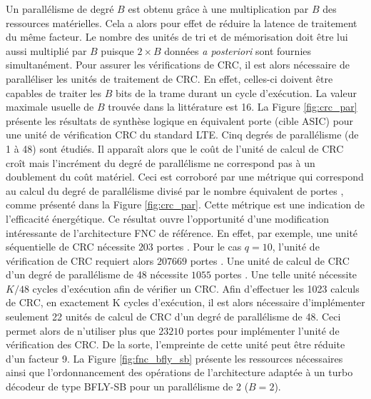 Un parallélisme de degré $B$ est obtenu grâce à une multiplication par $B$ des ressources 
matérielles. Cela a alors pour effet de réduire la latence de traitement du même facteur. Le nombre 
des unités de tri et
de mémorisation doit être lui aussi multiplié par $B$ puisque $2\times B$ données \textit{a posteriori} sont fournies 
simultanément. Pour assurer les vérifications de CRC, il est alors nécessaire de paralléliser les unités de traitement 
de CRC. En effet, celles-ci doivent être capables de traiter les $B$ bits de la trame durant un cycle d'exécution. La valeur 
maximale usuelle de $B$ trouvée dans la littérature est 16. La Figure \ref{fig:crc_par} présente les résultats de synthèse 
logique
en équivalent porte (cible ASIC) pour une unité de vérification CRC du standard LTE. Cinq degrés de parallélisme (de 1 à 48)
sont étudiés.
Il apparaît alors que le coût de l'unité de calcul de CRC croît mais l'incrément du degré de parallélisme ne correspond pas à un 
doublement du coût matériel. Ceci est corroboré par une métrique qui correspond au calcul du degré de parallélisme divisé par le nombre équivalent
de portes , comme présenté dans la Figure \ref{fig:crc_par}. Cette métrique est une indication
de l'efficacité énergétique. 
Ce résultat ouvre l'opportunité d'une modification intéressante de l'architecture FNC de référence. En effet, par 
exemple, une unité séquentielle de CRC nécessite $203$ portes . Pour le cas $q=10$, l'unité de vérification 
de CRC requiert alors $207669$ portes . Une unité de calcul de CRC d'un degré de parallélisme de 48 nécessite 
$1055$ portes . Une telle unité nécessite $K/48$ cycles d'exécution afin de vérifier un CRC. Afin d'effectuer
les 1023 calculs de CRC, en exactement K cycles d'exécution, il est alors nécessaire d'implémenter seulement 22 unités
de calcul de CRC d'un degré de parallélisme de 48. Ceci permet alors de n'utiliser plus que $23210$ portes 
pour implémenter l'unité de vérification des CRC. De  la sorte, l'empreinte de cette unité peut être réduite d'un facteur
9.
La Figure \ref{fig:fnc_bfly_sb} présente les ressources nécessaires ainsi que l'ordonnancement des 
opérations de l'architecture adaptée à un turbo décodeur de type BFLY-SB pour un parallélisme de 2 ($B=2$).

